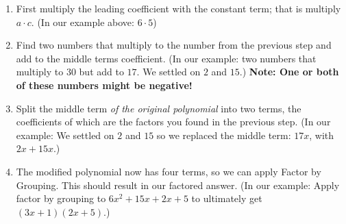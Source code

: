 \documentclass{ximera}
\begin{document}
\begin{enumerate}
    \item First multiply the leading coefficient with the constant term; that is multiply $a \cdot c$. (In our example above: $6 \cdot 5$)
    \item Find two numbers that multiply to the number from the previous step and add to the middle terms coefficient. (In our example: two numbers that multiply to $30$ but add to $17$. We settled on $2$ and $15$.) \textbf{Note: One or both of these numbers might be negative!}
    \item Split the middle term \textit{of the original polynomial} into two terms, the coefficients of which are the factors you found in the previous step. (In our example: We settled on $2$ and $15$ so we replaced the middle term: $17x$, with $2x + 15x$.)
    \item The modified polynomial now has four terms, so we can apply Factor by Grouping. This should result in our factored answer. (In our example: Apply factor by grouping to $6x^2 + 15x + 2x + 5$ to ultimately get $(3x + 1)(2x + 5)$.)
\end{enumerate}
\end{document}
